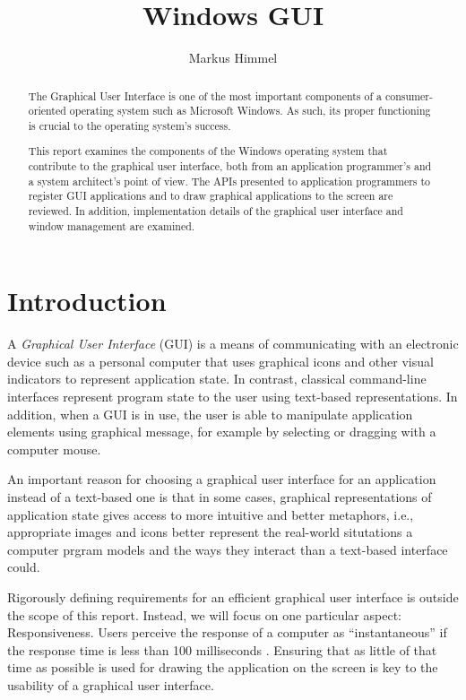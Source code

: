 \documentclass[10pt,twocolumn,a4paper]{article}
\author{Markus Himmel}
\title{Windows GUI}
\begin{document}
	\maketitle

	\begin{abstract}
		The Graphical User Interface is one of the most important components
		of a consumer-oriented operating system such as Microsoft Windows. As
		such, its proper functioning is crucial to the operating system's success.

		This report examines the components of the Windows operating system
		that contribute to the graphical user interface, both from an
		application programmer's and a system architect's point of view. The
		APIs presented to application programmers to register GUI applications
		and to draw graphical applications to the screen are reviewed. In addition,
		implementation details of the graphical user interface and window management
		are examined.
	\end{abstract}

	\section{Introduction}
		A \textit{Graphical User Interface} (GUI) is a means of communicating
		with an electronic device such as a personal computer that uses graphical
		icons and other visual indicators to represent application state. In
		contrast, classical command-line interfaces represent program state to
		the user using text-based representations. In addition, when a GUI is
		in use, the user is able to manipulate application elements using graphical
		message, for example by selecting or dragging with a computer mouse.

		An important reason for choosing a graphical user interface for an
		application instead of a text-based one is that in some cases, graphical
		representations of application state gives access to more intuitive and
		better metaphors, i.e., appropriate images and icons better represent
		the real-world situtations a computer prgram models and the ways they
		interact than a text-based interface could.

		Rigorously defining requirements for an efficient graphical user
		interface is outside the scope of this report. Instead, we will focus
		on one particular aspect: Responsiveness. Users perceive the response
		of a computer as \enquote{instantaneous} if the response time is less
		than 100 milliseconds \cite{miller1968response}. Ensuring that as
		little of that time as possible is used for drawing the application on
		the screen is key to the usability of a graphical user interface.
\end{document}

